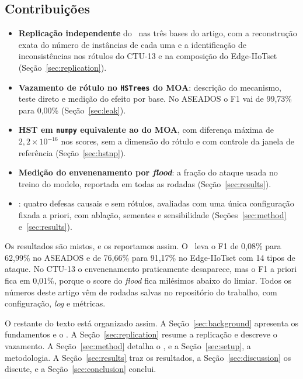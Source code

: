 \subsection*{Contribuições}
\begin{itemize}
\item \textbf{Replicação independente} do \modus\ nas três bases do artigo, com a reconstrução
exata do número de instâncias de cada uma e a identificação de inconsistências nos rótulos do
CTU-13 e na composição do Edge-IIoTset (Seção~\ref{sec:replication}).
\item \textbf{Vazamento de rótulo no \texttt{HSTrees} do MOA}: descrição do mecanismo, teste direto
e medição do efeito por base. No ASEADOS o F1 vai de 99,73\% para 0,00\% (Seção~\ref{sec:leak}).
\item \textbf{HST em \texttt{numpy} equivalente ao do MOA}, com diferença máxima de
$2{,}2\times10^{-16}$ nos scores, sem a dimensão do rótulo e com controle da janela de referência
(Seção~\ref{sec:hstnp}).
\item \textbf{Medição do envenenamento por \emph{flood}}: a fração do ataque usada no treino do
modelo, reportada em todas as rodadas (Seção~\ref{sec:results}).
\item \textbf{\modusp}: quatro defesas causais e sem rótulos, avaliadas com uma única configuração
fixada a priori, com ablação, sementes e sensibilidade (Seções~\ref{sec:method}
e~\ref{sec:results}).
\end{itemize}

Os resultados são mistos, e os reportamos assim. O \modusp\ leva o F1 de 0,08\% para 62,99\% no
ASEADOS e de 76,66\% para 91,17\% no Edge-IIoTset com 14 tipos de ataque. No CTU-13 o
envenenamento praticamente desaparece, mas o F1 a priori fica em 0,01\%, porque o score do
\emph{flood} fica milésimos abaixo do limiar. Todos os números deste artigo vêm de rodadas salvas
no repositório do trabalho, com configuração, \emph{log} e métricas.

O restante do texto está organizado assim. A Seção~\ref{sec:background} apresenta os fundamentos e
o \modus. A Seção~\ref{sec:replication} resume a replicação e descreve o vazamento. A
Seção~\ref{sec:method} detalha o \modusp, e a Seção~\ref{sec:setup}, a metodologia. A
Seção~\ref{sec:results} traz os resultados, a Seção~\ref{sec:discussion} os discute, e a
Seção~\ref{sec:conclusion} conclui.
